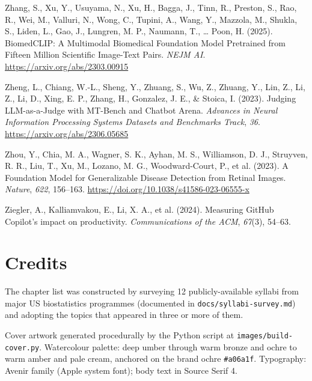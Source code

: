 \documentclass[
  letterpaper,
  11pt]{scrbook}
\newlength{\cslhangindent}
\newenvironment{CSLReferences}[2] %
 {\begin{list}{}{%
  \setlength{\itemindent}{0pt}
  \setlength{\leftmargin}{0pt}
  \setlength{\parsep}{0pt}
  \ifodd #1
   \setlength{\leftmargin}{\cslhangindent}
   \setlength{\itemindent}{-1\cslhangindent}
  \fi
  \setlength{\itemsep}{#2\baselineskip}}}
 {\end{list}}
\begin{document}
\begin{CSLReferences}{1}{0}
Zhang, S., Xu, Y., Usuyama, N., Xu, H., Bagga, J., Tinn, R., Preston,
S., Rao, R., Wei, M., Valluri, N., Wong, C., Tupini, A., Wang, Y.,
Mazzola, M., Shukla, S., Liden, L., Gao, J., Lungren, M. P., Naumann,
T., \ldots{} Poon, H. (2025). {BiomedCLIP}: {A Multimodal Biomedical
Foundation Model Pretrained from Fifteen Million Scientific Image-Text
Pairs}. \emph{NEJM AI}. \url{https://arxiv.org/abs/2303.00915}

Zheng, L., Chiang, W.-L., Sheng, Y., Zhuang, S., Wu, Z., Zhuang, Y.,
Lin, Z., Li, Z., Li, D., Xing, E. P., Zhang, H., Gonzalez, J. E., \&
Stoica, I. (2023). {Judging LLM-as-a-Judge with MT-Bench and Chatbot
Arena}. \emph{Advances in Neural Information Processing Systems Datasets
and Benchmarks Track}, \emph{36}. \url{https://arxiv.org/abs/2306.05685}

{Zhou, Y., Chia, M. A., Wagner, S. K., Ayhan, M. S., Williamson, D. J.,
Struyven, R. R., Liu, T., Xu, M., Lozano, M. G., Woodward-Court, P., et
al.} (2023). {A Foundation Model for Generalizable Disease Detection
from Retinal Images}. \emph{Nature}, \emph{622}, 156--163.
\url{https://doi.org/10.1038/s41586-023-06555-x}

{Ziegler, A., Kalliamvakou, E., Li, X. A., et al.} (2024). Measuring
{GitHub Copilot}'s impact on productivity. \emph{Communications of the
ACM}, \emph{67}(3), 54--63.

\end{CSLReferences}

\cleardoublepage
{}
{}
\appendix

\chapter*{Credits}\label{credits}


The chapter list was constructed by surveying 12 publicly-available
syllabi from major US biostatistics programmes (documented in
\texttt{docs/syllabi-survey.md}) and adopting the topics that appeared
in three or more of them.

Cover artwork generated procedurally by the Python script at
\texttt{images/build-cover.py}. Watercolour palette: deep umber through
warm bronze and ochre to warm amber and pale cream, anchored on the
brand ochre \texttt{\#a06a1f}. Typography: Avenir family (Apple system
font); body text in Source Serif 4.
\end{document}
